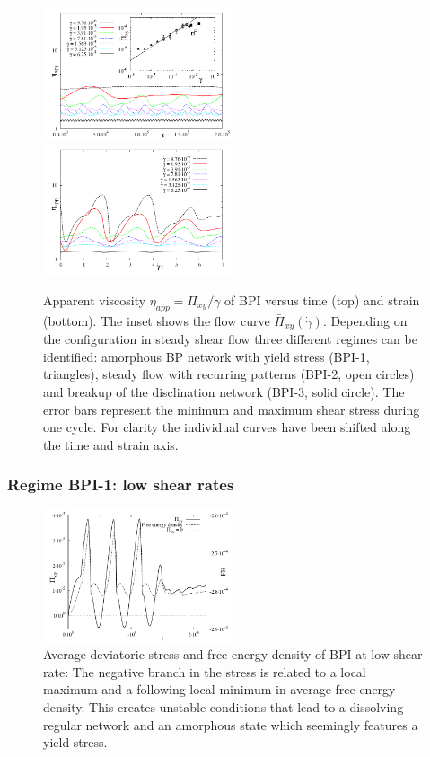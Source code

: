 \documentclass[aps,pre,reprint,superscriptaddress, twocolumn]{revtex4}
\newcommand{\gd}{\dot{\gamma}}
\begin{document}
\begin{figure}[htpb]
\includegraphics[width=0.495\textwidth]{stress_bp1.pdf}
\includegraphics[width=0.495\textwidth]{stress_vs_strain_bp1.pdf}
\caption{Apparent viscosity $\eta_{app}=\Pi_{xy}/\dot{\gamma}$ of BPI versus time (top) 
and strain (bottom). The inset shows the flow curve $\bar{\Pi}_{xy}(\gd)$. 
Depending on the configuration in steady shear flow three different regimes 
can be identified: amorphous BP network with yield stress (BPI-1, triangles), 
steady flow with recurring patterns (BPI-2, open circles) and 
breakup of the disclination network (BPI-3, solid circle). 
The error bars represent the minimum and maximum shear stress 
during one cycle. For clarity the individual curves have been shifted along
the time and strain axis.}
\label{bp1-rheo}
\end{figure}


\subsubsection{Regime BPI-1: low shear rates}

\begin{figure}[htpb]
\includegraphics[width=0.495\textwidth]{stress_fe_yield_bp1.pdf}
\caption{Average deviatoric stress and free energy density of BPI at low shear rate: 
The negative branch in the stress is related to a local maximum and a following local 
minimum in average free energy density. This creates unstable conditions that lead 
to a dissolving regular network and an amorphous state which 
seemingly features a yield stress.}
\label{bp1-fe-yield}
\end{figure}
\end{document}
